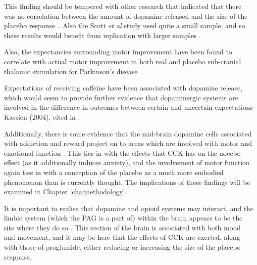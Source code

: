 This finding should be tempered with other research that indicated that there was no correlation between the amount of dopamine released and the size of the placebo response~\cite{Scott2007a}. %
Also the Scott \textit{et al} study used quite a small sample, and so these results would benefit from replication with larger samples \cite{vul2009puzzlingly}.

Also, the expectancies surrounding motor improvement have been found to correlate with actual motor improvement in both real and placebo sub-cranial thalamic stimulation for Parkinson's disease~\cite{Benedetti2004a}. 

Expectations of receiving caffeine have been associated with dopamine release, which would seem to provide further evidence that dopaminergic systems are involved in the difference in outcomes between certain and uncertain expectations Kassien (2004), cited in \cite{Beauregard2007a}. 

Additionally, there is some evidence that the mid-brain dopamine cells associated with addiction and reward project on to areas which are involved with motor and emotional function \cite{DeLaFuente-Fernandez2002}.  This ties in with the effects that CCK has on the nocebo effect (as it additionally induces anxiety), and the involvement of motor function again ties in with a conception of the placebo as a much more embodied phenomenon than is currently thought. The implications of these findings will be examined in Chapter \ref{cha:methodology}. 

It is important to realise that dopamine and opioid systems may interact, and the limbic system (which the PAG is a part of) within the brain appears to be the site where they do so \cite{Fuente-Fernandez2002}. This section of the brain is associated with both mood and movement, and it may be here that the effects of CCK are exerted, along with those of proglumide, either reducing or increasing the size of the placebo response. 




